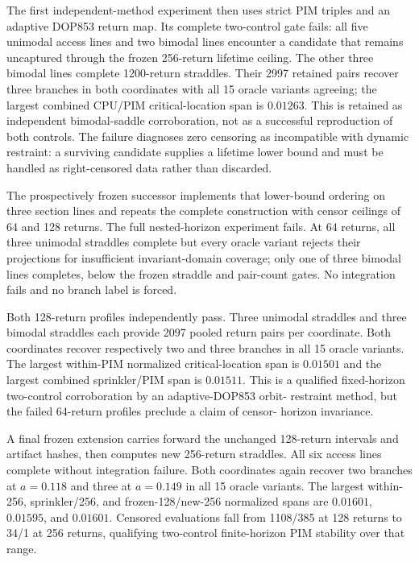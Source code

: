The first independent-method experiment then uses strict PIM triples and an
adaptive DOP853 return map.  Its complete two-control gate fails: all five
unimodal access lines and two bimodal lines encounter a candidate that remains
uncaptured through the frozen 256-return lifetime ceiling.  The other three
bimodal lines complete 1200-return straddles.  Their 2997 retained pairs recover
three branches in both coordinates with all 15 oracle variants agreeing; the
largest combined CPU/PIM critical-location span is $0.01263$.  This is retained
as independent bimodal-saddle corroboration, not as a successful reproduction
of both controls.  The failure diagnoses zero censoring as incompatible with
dynamic restraint: a surviving candidate supplies a lifetime lower bound and
must be handled as right-censored data rather than discarded.

The prospectively frozen successor implements that lower-bound ordering on
three section lines and repeats the complete construction with censor ceilings
of 64 and 128 returns.  The full nested-horizon experiment fails.  At 64
returns, all three unimodal straddles complete but every oracle variant rejects
their projections for insufficient invariant-domain coverage; only one of
three bimodal lines completes, below the frozen straddle and pair-count gates.
No integration fails and no branch label is forced.

Both 128-return profiles independently pass.  Three unimodal straddles and
three bimodal straddles each provide 2097 pooled return pairs per coordinate.
Both coordinates recover respectively two and three branches in all 15 oracle
variants.  The largest within-PIM normalized critical-location span is
$0.01501$ and the largest combined sprinkler/PIM span is $0.01511$.  This is a
qualified fixed-horizon two-control corroboration by an adaptive-DOP853 orbit-
restraint method, but the failed 64-return profiles preclude a claim of censor-
horizon invariance.

A final frozen extension carries forward the unchanged 128-return intervals and
artifact hashes, then computes new 256-return straddles.  All six access lines
complete without integration failure.  Both coordinates again recover two
branches at $a=0.118$ and three at $a=0.149$ in all 15 oracle variants.  The
largest within-256, sprinkler/256, and frozen-128/new-256 normalized spans are
$0.01601$, $0.01595$, and $0.01601$.  Censored evaluations fall from 1108/385
at 128 returns to 34/1 at 256 returns, qualifying two-control finite-horizon
PIM stability over that range.

